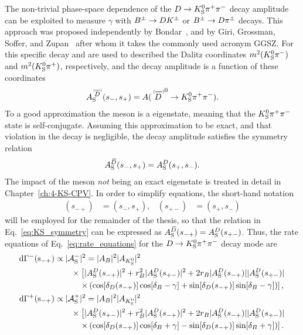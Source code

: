 The non-trivial phase-space dependence of the ${D}\rightarrow{\ensuremath{{K}^0_{\mathrm{S}}}}{\ensuremath{{\pi}^+}}{\ensuremath{{\pi}^-}}$ decay amplitude can be exploited to measure $\gamma$ with ${{B}^\pm}\rightarrow {\ensuremath{D}}{\ensuremath{{K}^\pm}}$ or ${{B}^\pm}\rightarrow {\ensuremath{D}}{\ensuremath{{\pi}^\pm}}$ decays. This approach was proposed independently by Bondar~\cite{BONDARGGSZ}, and by Giri, Grossman, Soffer, and Zupan~\cite{giriDeterminingGammaUsing2003} after whom it takes the commonly used acronym GGSZ. For this specific decay \sm and \sp are used to described the Dalitz coordinates $m^2({{K}^0_{\mathrm{S}}}{{\pi}^-})$ and $m^2({{K}^0_{\mathrm{S}}}{{\pi}^+})$, respectively, and the \D decay amplitude is a function of these coordinates
\begin{align}\label{eq:ADDb_definition}
\ADorDbS (\smpLong)= A(\DorDbar^0\to K^0_\text{S} \pi^+\pi^-).
\end{align}
To a good approximation the \KS meson is a \CP eigenstate, meaning that the ${{K}^0_{\mathrm{S}}}{{\pi}^+}{{\pi}^-}$ state is self-conjugate. Assuming this approximation to be exact, and that \CP violation in the \D decay is negligible, the \D decay amplitude satisfies the symmetry relation
\begin{align}\label{eq:KS_symmetry}
     A_{\rm S}^{{\kern 0.18em\overline{\kern -0.18em D}}}(s_-, s_+)=A_{\rm S}^{D}(s_+, s_-).
 \end{align} 
 The impact of the \KS meson \emph{not} being an exact \CP eigenstate is treated in detail in Chapter~\ref{ch:4-KS-CPV}. In order to simplify equations, the short-hand notation 
 \begin{align}
     (s_{-+})&=(s_-,s_+), &(s_{+-})&=(s_+,s_-)
 \end{align} will be employed for the remainder of the thesis, so that the relation in Eq.~\eqref{eq:KS_symmetry} can be expressed as $A_{\rm S}^{{\kern 0.18em\overline{\kern -0.18em D}}}(s_{-+})=A_{\rm S}^{D}(s_{+-})$. Thus, the rate equations of Eq.~\eqref{eq:rate_equations} for the ${D}\rightarrow{\ensuremath{{K}^0_{\mathrm{S}}}}{\ensuremath{{\pi}^+}}{\ensuremath{{\pi}^-}}$ decay mode are
 \begin{subequations}\label{eq:Gamma_Bminus}
\begin{align} 
    \rm {d} \Gamma^-(s_{-+}) &\propto |\mathcal{A}_{\rm S}^-|^2 = |A_{B}|^2|A_{{{K}^0_{\mathrm{S}}}}|^2 \notag \\
    &\qquad\times\left[|A_{\rm S}^{D}(s_{-+})|^2 + r_{B}^2 |A_{\rm S}^{D}(s_{+-})|^2 + 2r_{B} |A_{\rm S}^{D}(s_{-+})||A_{\rm S}^{D}(s_{+-})|\right .
    \notag \\
    &\quad\qquad \left. \times \left(\cos[\delta_D(s_{-+})]\cos[\delta_{B}-\gamma]+\sin[\delta_D(s_{-+})]\sin[\delta_{B}-\gamma]\right)\right], \\
    \rm {d} \Gamma^+(s_{-+}) &\propto |\mathcal{A}_{\rm S}^+|^2 = |A_{B}|^2|A_{{{K}^0_{\mathrm{S}}}}|^2 \notag \\
    &\qquad\times\left[|A_{\rm S}^{D}(s_{+-})|^2 + r_{B}^2 |A_{\rm S}^{D}(s_{-+})|^2 + 2r_{B} |A_{\rm S}^{D}(s_{-+})||A_{\rm S}^{D}(s_{+-})|\right .
    \notag \\
    &\quad\qquad \left. \times \left(\cos[\delta_D(s_{-+})]\cos[\delta_{B}+\gamma]-\sin[\delta_D(s_{-+})]\sin[\delta_{B}+\gamma]\right)\right].
\end{align}
\end{subequations}
